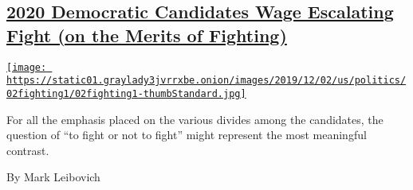 \begin{enumerate}
\begin{enumerate}
    \hypertarget{2020-democratic-candidates-wage-escalating-fight-on-the-merits-of-fighting}{%
    \subsection{\texorpdfstring{\href{/2019/11/30/us/politics/2020-democratic-candidates.html}{2020
    Democratic Candidates Wage Escalating Fight (on the Merits of
    Fighting)}}{2020 Democratic Candidates Wage Escalating Fight (on the Merits of Fighting)}}\label{2020-democratic-candidates-wage-escalating-fight-on-the-merits-of-fighting}}

    \href{/2019/11/30/us/politics/2020-democratic-candidates.html}{\texttt{[image: https://static01.graylady3jvrrxbe.onion/images/2019/12/02/us/politics/02fighting1/02fighting1-thumbStandard.jpg]}}

    For all the emphasis placed on the various divides among the
    candidates, the question of ``to fight or not to fight'' might
    represent the most meaningful contrast.

    By Mark Leibovich
  \end{enumerate}
\end{enumerate}

